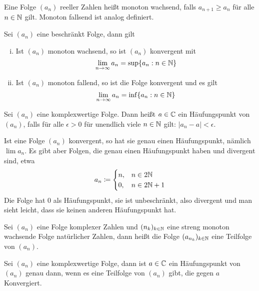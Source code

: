     \begin{defn}
        Eine Folge $(a_n)$ reeller Zahlen heißt monoton wachsend, falls $a_{n+1}\ge a_n$ für alle $n\in \mathbb{N}$ gilt.
        Monoton fallsend ist analog definiert.
    \end{defn}
    \begin{lemma}
        Sei $(a_n)$ eine beschränkt Folge, dann gilt
        \begin{enumerate}[(i)]
            \item Ist $(a_n)$ monoton wachsend, so ist $(a_n)$ konvergent mit 
            \[
            \lim_{n\to \infty} a_n = \sup \{a_n : n\in \mathbb{N}\}    
            \]
            \item Ist $(a_n)$ monoton fallend, so ist die Folge konvergent und es gilt
            \[
            \lim_{n\to \infty} a_n = \inf\{a_n : n\in \mathbb{N}\}    
            \]
        \end{enumerate}
    \end{lemma}
    \begin{defn}
        Sei $(a_n)$ eine komplexwertige Folge. Dann heißt $a\in \mathbb{C}$ ein Häufungspunkt von $(a_n)$, falls für alle $\epsilon>0$ für unendlich viele $n\in \mathbb{N}$ gilt: $\vert a_n-a\vert <\epsilon$. 
    \end{defn}
    \begin{bem}
        Ist eine Folge $(a_n)$ konvergent, so hat sie genau einen Häufungspunkt, nämlich $\lim a_n$. Es gibt aber Folgen, die genau einen Häufungspunkt haben und divergent sind, etwa 
        \[
        a_n \coloneqq \begin{cases}
            n, & n \in 2\mathbb{N} \\
            0, & n\in 2\mathbb{N} +1
        \end{cases}    
        \] Die Folge hat $0$ als Häufungspunkt, sie ist unbeschränkt, also divergent und man sieht leicht, dass 
        sie keinen anderen Häufungspunkt hat. 
    \end{bem}
    \begin{defn}
        Sei $(a_n)$ eine Folge komplexer Zahlen und $(n_k)_{k\in \mathbb{N}}$ eine streng monoton wachsende Folge natürlicher Zahlen, dann heißt die 
        Folge $(a_{n_k})_{k\in \mathbb{N}}$ eine Teilfolge von $(a_n)$.
    \end{defn}
    \begin{lemma}
        Sei $(a_n)$ eine komplexwertige Folge, dann ist $a\in \mathbb{C}$ ein Häufungspunkt von $(a_n)$ genau dann, wenn es eine Teilfolge von $(a_n)$ gibt, die gegen $a$ Konvergiert. 
    \end{lemma}
